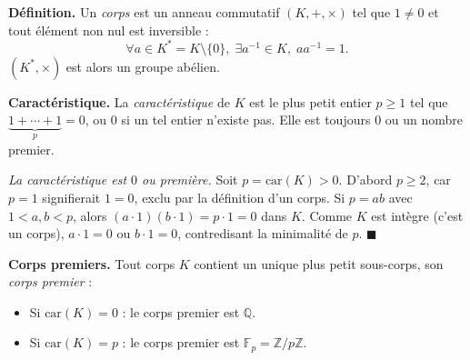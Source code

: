 ﻿%



\begin{tcolorbox}[thmbox]
  \textbf{Définition.}\enspace%
  Un \emph{corps} est un anneau commutatif $(K, +, \times)$ tel que
  $1 \neq 0$ et tout élément non nul est inversible :
  \[
    \forall a \in K^* = K \setminus \{0\},\; \exists a^{-1} \in K,\; aa^{-1} = 1.
  \]
  $(K^*, \times)$ est alors un groupe abélien.

  \medskip
  \textbf{Caractéristique.}\enspace%
  La \emph{caractéristique} de $K$ est le plus petit entier $p \geq 1$ tel que
  $\underbrace{1+\cdots+1}_{p} = 0$, ou $0$ si un tel entier n'existe pas.
  Elle est toujours $0$ ou un nombre premier.
\end{tcolorbox}

\begin{mdframed}[style=proofbar]
  \textit{La caractéristique est $0$ ou première.}
  Soit $p = \mathrm{car}(K) > 0$. D'abord $p \geq 2$, car $p = 1$ signifierait
  $1 = 0$, exclu par la définition d'un corps.
  Si $p = ab$ avec $1 < a, b < p$, alors $(a \cdot 1)(b \cdot 1) = p \cdot 1 = 0$
  dans $K$. Comme $K$ est intègre (c'est un corps), $a \cdot 1 = 0$ ou $b \cdot 1 = 0$,
  contredisant la minimalité de $p$. \hfill$\blacksquare$
\end{mdframed}

\begin{tcolorbox}[thmbox]
  \textbf{Corps premiers.}\enspace%
  Tout corps $K$ contient un unique plus petit sous-corps, son \emph{corps premier} :
  \begin{itemize}
    \item Si $\mathrm{car}(K) = 0$ : le corps premier est $\mathbb{Q}$.
    \item Si $\mathrm{car}(K) = p$ : le corps premier est $\mathbb{F}_p = \mathbb{Z}/p\mathbb{Z}$.
  \end{itemize}
\end{tcolorbox}

